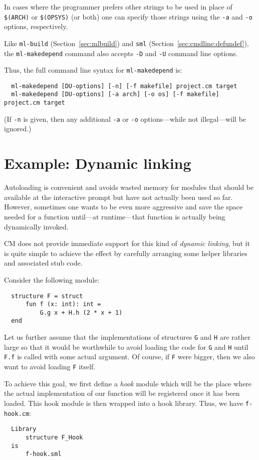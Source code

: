 \documentclass[titlepage,letterpaper]{article}
\begin{document}
In cases where the programmer prefers other strings to be used in
place of {\tt \$(ARCH)} or {\tt \$(OPSYS)} (or both) one can specify
those strings using the {\tt -a} and {\tt -o} options, respectively.

Like {\tt ml-build} (Section~\ref{sec:mlbuild}) and {\tt sml}
(Section~\ref{sec:cmdline:defundef}), the {\tt ml-makedepend} command
also accepts {\tt -D} and {\tt -U} command line options.

Thus, the full command line syntax for {\tt ml-makedepend} is:

\begin{verbatim}
  ml-makedepend [DU-options] [-n] [-f makefile] project.cm target
  ml-makedepend [DU-options] [-a arch] [-o os] [-f makefile] project.cm target
\end{verbatim}

(If {\tt -n} is given, then any additional {\tt -a} or {\tt -o}
options---while not illegal---will be ignored.)

\section{Example: Dynamic linking}
\label{sec:dynlink}

Autoloading is convenient and avoids wasted memory for modules that
should be available at the interactive prompt but have not actually
been used so far.  However, sometimes one wants to be even more
aggressive and save the space needed for a function until---at
runtime---that function is actually being dynamically invoked.

CM does not provide immediate support for this kind of {\em dynamic
linking}, but it is quite simple to achieve the effect by carefully
arranging some helper libraries and associated stub code.

Consider the following module:
\begin{verbatim}
  structure F = struct
      fun f (x: int): int =
          G.g x + H.h (2 * x + 1)
  end
\end{verbatim}

Let us further assume that the implementations of structures {\tt G}
and {\tt H} are rather large so that it would be worthwhile to avoid
loading the code for {\tt G} and {\tt H} until {\tt F.f} is called
with some actual argument.  Of course, if {\tt F} were bigger, then we
also want to avoid loading {\tt F} itself.

To achieve this goal, we first define a {\em hook} module which will
be the place where the actual implementation of our function will be
registered once it has been loaded.  This hook module is then wrapped
into a hook library.  Thus, we have {\tt f-hook.cm}:
\begin{verbatim}
  Library
      structure F_Hook
  is
      f-hook.sml
\end{verbatim}
\end{document}

